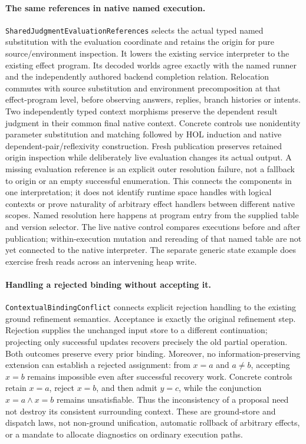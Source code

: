 \documentclass[11pt]{article}
\theoremstyle{definition}
\theoremstyle{remark}
\begin{document}
\paragraph{The same references in native named execution.}
\texttt{SharedJudgment\-EvaluationReferences} selects the actual typed named
substitution with the evaluation coordinate and retains the origin for pure
source/environment inspection. It lowers the existing service interpreter to
the existing effect program. Its decoded worlds agree exactly with the named
runner and the independently authored backend completion relation.
Relocation commutes with source substitution and environment precomposition
at that effect-program level, before observing answers, replies, branch
histories or intents. Two independently typed context morphisms preserve the
dependent result judgment in their common final native context. Concrete
controls use nonidentity parameter substitution and matching followed by
HOL induction and native dependent-pair/reflexivity construction. Fresh
publication preserves retained origin inspection while deliberately live
evaluation changes its actual output. A missing evaluation reference is an
explicit outer resolution failure, not a fallback to origin or an empty
successful enumeration. This connects the components in one interpretation;
it does not identify runtime space handles with logical contexts or prove
naturality of arbitrary effect handlers between different native scopes.
Named resolution here happens at program entry from the supplied table and
version selector. The live native control compares executions before and
after publication; within-execution mutation and rereading of that named
table are not yet connected to the native interpreter. The separate generic
state example does exercise fresh reads across an intervening heap write.

\paragraph{Handling a rejected binding without accepting it.}
\texttt{ContextualBindingConflict} connects explicit rejection handling to
the existing ground refinement semantics. Acceptance is exactly the original
refinement step. Rejection supplies the unchanged input store to a different
continuation; projecting only successful updates recovers precisely the old
partial operation. Both outcomes preserve every prior binding. Moreover, no
information-preserving extension can establish a rejected assignment: from
$x=a$ and $a\ne b$, accepting $x=b$ remains impossible even after successful
recovery work. Concrete controls retain $x=a$, reject $x=b$, and then admit
$y=c$, while the conjunction $x=a\land x=b$ remains unsatisfiable. Thus the
inconsistency of a proposal need not destroy its consistent surrounding
context. These are ground-store and dispatch laws, not non-ground unification,
automatic rollback of arbitrary effects, or a mandate to allocate diagnostics
on ordinary execution paths.
\end{document}

